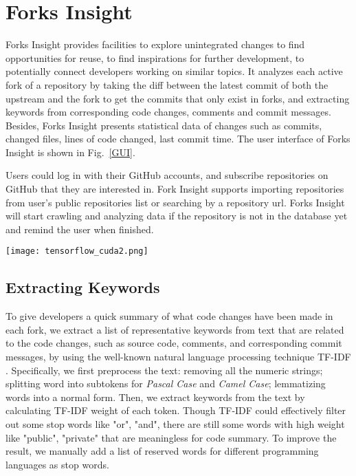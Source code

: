 \section{Forks Insight}

Forks Insight provides facilities to explore unintegrated changes to find opportunities for reuse, to find inspirations for further development, to potentially connect developers working on similar topics.
%
It analyzes each active fork of a repository by taking the diff between the latest commit of both the upstream and the fork to get the commits that only exist in forks, and extracting keywords from corresponding code changes, comments and commit messages.
%
Besides, Forks Insight presents statistical data of changes such as commits, changed files, lines of code changed, last commit time. The user interface of Forks Insight is shown in Fig.~\ref{GUI}.

Users could log in with their GitHub accounts, and subscribe repositories on GitHub that they are interested in. Fork Insight supports importing repositories from user's public repositories list or searching by a repository url. Forks Insight will start crawling and analyzing data if the repository is not in the database yet and remind the user when finished.

\begin{figure*}[ht]
\texttt{[image: tensorflow\_cuda2.png]}
\caption{User Interface of Forks Insight. This example shows searching "cuda" in repository of \emph{tensorflow/tensorflow}.}
\vspace{-6pt}
\label{GUI}
\end{figure*}

\subsection{Extracting Keywords}
To give developers a quick summary of what code changes have been made in each fork, we extract a list of representative keywords from text that are related to the code changes, such as source code, comments, and corresponding commit messages, by using the well-known natural language processing technique TF-IDF \cite{salton1988term}. Specifically, we first preprocess the text: removing all the numeric strings; splitting word into subtokens for \emph{Pascal Case} and \emph{Camel Case}; lemmatizing words into a normal form. Then, we extract keywords from the text by calculating TF-IDF weight of each token. Though TF-IDF could effectively filter out some stop words like "or", "and", there are still some words with high weight like "public", "private" that are meaningless for code summary. To improve the result, we manually add a list of  reserved words for different programming languages as stop words.


